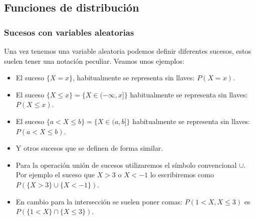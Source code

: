 % 
% 

\subsection{Funciones de distribución}
\begin{frame}
\frametitle{Sucesos con variables aleatorias}

Una vez tenemos una variable aleatoria podemos definir diferentes sucesos, estos suelen tener una  notación peculiar. Veamos unos ejemplos:

\begin{itemize}
\item El suceso $\{X=x\}$, habitualmente se representa sin llaves: $P(X=x)$.
\item El suceso $\{X\leq x\}=\{X \in (-\infty,x]\}$ habitualmente se representa sin llaves: $P(X\leq x)$.
\item El suceso $\{a< X\leq b\}=\{X \in (a,b]\}$ habitualmente se representa sin llaves: $P(a< X \leq b)$.
\item Y otros sucesos que se definen de forma similar.
\item Para la operación unión de sucesos utilizaremos el símbolo convencional $\cup$. Por ejemplo el suceso que $X>3$ o $X<-1$ lo  escribiremos como $P(\{X>3\} \cup \{X<-1\})$.
\item En cambio para la intersección se suelen poner comas: $P(1<X, X\leq 3)$  es $P(\{1<X\}\cap \{X\leq 3\})$.   
\end{itemize}
\end{frame}




